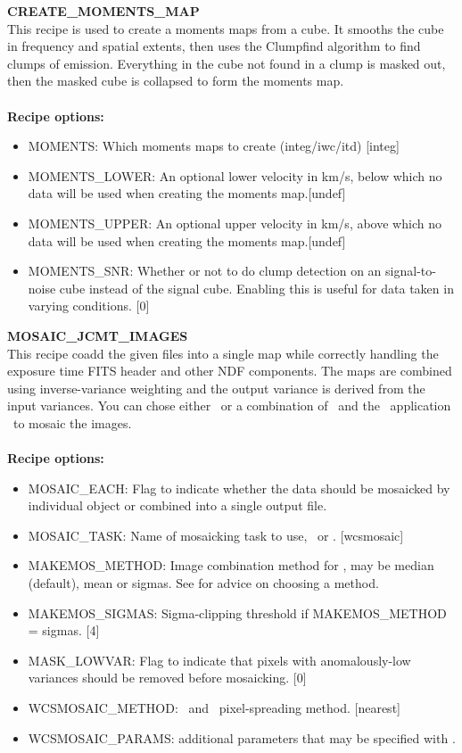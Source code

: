 \documentclass[11pt,oneside,chapters]{starlink}
\begin{document}
\textbf{CREATE\_MOMENTS\_MAP}\\
This recipe is used to create a moments maps from a cube. It smooths
the cube in frequency and spatial extents, then uses the Clumpfind
algorithm to find clumps of emission. Everything in the cube not found
in a clump is masked out, then the masked cube is collapsed to form
the moments map.
\\\\
\textbf{Recipe options:}
\begin{itemize}
\item MOMENTS:  Which moments maps to create (integ/iwc/itd) [integ]

\item MOMENTS\_LOWER: An optional lower velocity in km/s, below which
no data will be used when creating the moments map.[undef]

\item MOMENTS\_UPPER: An optional upper velocity in km/s, above which
no data will be used when creating the moments map.[undef]

\item MOMENTS\_SNR: Whether or not to do clump detection on an
signal-to-noise cube instead of the signal cube. Enabling this is
useful for data taken in varying conditions. [0]
\end{itemize}

\textbf{MOSAIC\_JCMT\_IMAGES}\\
This recipe coadd the given files into a single map while correctly
handling the exposure time FITS header and other NDF components. The
maps are combined using inverse-variance weighting and the output
variance is derived from the input variances. You can chose either
\wcsmosaic\ or a combination of \wcsalign\ and the \ccdpack\
application \makemos\ to mosaic the images.
\\\\
\textbf{Recipe options:}
\begin{itemize}
\item MOSAIC\_EACH: Flag to indicate whether the data should be
mosaicked by individual object or combined into a single output file.
\item MOSAIC\_TASK: Name of mosaicking task to use, \wcsmosaic\ or
\makemos. [wcsmosaic]
\item MAKEMOS\_METHOD: Image combination method for \makemos, may be
median (default), mean or sigmas. See  for advice on choosing a method.
\item MAKEMOS\_SIGMAS: Sigma-clipping threshold if MAKEMOS\_METHOD =
sigmas. [4]
\item MASK\_LOWVAR: Flag to indicate that pixels with anomalously-low
variances should be removed before mosaicking. [0]
\item WCSMOSAIC\_METHOD: \wcsmosaic\ and \wcsalign\ pixel-spreading
method. [nearest]
\item WCSMOSAIC\_PARAMS: additional parameters that may be specified
with \wcsmosaic.

\end{itemize}
\end{document}
